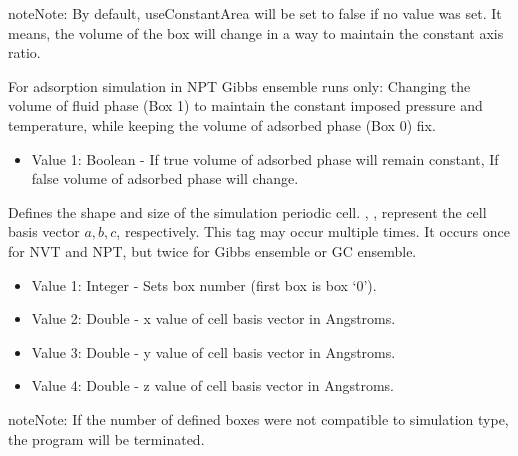 \documentclass[letterpaper,10pt,english]{sphinxmanual}
\begin{document}
\begin{description}
\begin{itemize}
\end{itemize}

\begin{sphinxadmonition}{note}{Note:}
By default, useConstantArea will be set to false if no value was set. It means, the volume of the box will change in a way to maintain the constant axis ratio.
\end{sphinxadmonition}

\item[{\sphinxcode{\sphinxupquote{FixVolBox0}}}] \leavevmode
For adsorption simulation in NPT Gibbs ensemble runs only: Changing the volume of fluid phase (Box 1) to maintain the constant imposed pressure and temperature, while keeping the volume of adsorbed phase (Box 0) fix.
\begin{itemize}
\item {} 
Value 1: Boolean - If true volume of adsorbed phase will remain constant, If false volume of adsorbed phase will change.

\end{itemize}

\item[{\sphinxcode{\sphinxupquote{CellBasisVector}}}] \leavevmode
Defines the shape and size of the simulation periodic cell. , ,  represent the cell basis vector \(a,b,c\), respectively. This tag may occur multiple times. It occurs once for NVT and NPT, but twice for Gibbs ensemble or GC ensemble.
\begin{itemize}
\item {} 
Value 1: Integer - Sets box number (first box is box ‘0’).

\item {} 
Value 2: Double - x value of cell basis vector in Angstroms.

\item {} 
Value 3: Double - y value of cell basis vector in Angstroms.

\item {} 
Value 4: Double - z value of cell basis vector in Angstroms.

\end{itemize}

\begin{sphinxadmonition}{note}{Note:}
If the number of defined boxes were not compatible to simulation type, the program will be terminated.
\end{sphinxadmonition}


\end{description}
\end{document}
